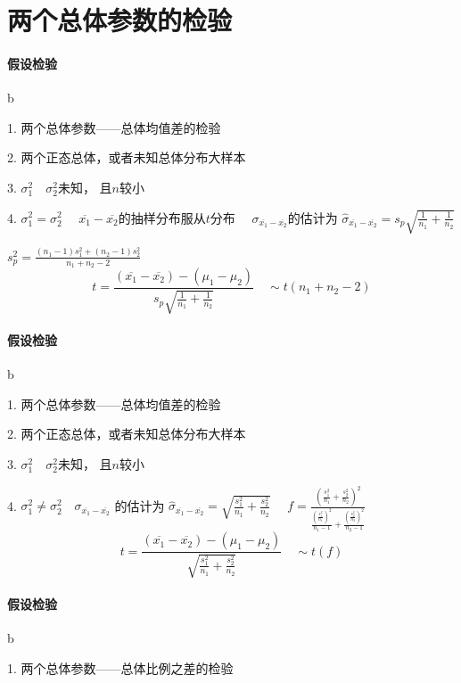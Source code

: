 \documentclass[UTF8,10pt]{book}
\begin{document}
    \section{两个总体参数的检验}

    
    \paragraph{假设检验} b
   
    1. 两个总体参数——总体均值差的检验 
    
    2. 两个正态总体，或者未知总体分布大样本 
    
    3. $\sigma_1^2 \quad \sigma_2^2$未知，
    且$n$较小 
    
    4. $\sigma_1^2 = \sigma_2^2 \quad$	
    $\overline{x_1} - \overline{x_2}$的抽样分布服从$t$分布 
    $\quad \sigma_{\overline{x_1} - \overline{x_2}} $的估计为 
    $ \hat{\sigma}_{\overline{x_1} - \overline{x_2}} =s_p \sqrt{\frac{1}{n_1}+\frac{1}{n_2}} $ 
    
    $s_p^2 = \frac{(n_1-1)s_1^2 + (n_2-1)s_2^2}{n_1+n_2-2}$ $$ t = \frac{(\overline{x_1} - \overline{x_2} )- (\mu_1-\mu_2)}{s_p \sqrt{\frac{1}{n_1}+\frac{1}{n_2}}} \quad \sim t(n_1+n_2-2)$$
    
    \paragraph{假设检验} b
    
    1. 两个总体参数——总体均值差的检验 
    
    2. 两个正态总体，或者未知总体分布大样本 
    
    3. $\sigma_1^2 \quad \sigma_2^2$未知，    且$n$较小 
    
    4. $\sigma_1^2 \neq \sigma_2^2 \quad \sigma_{\overline{x_1} - \overline{x_2}} $
    的估计为 $ \hat{\sigma}_{\overline{x_1} - \overline{x_2}} =\sqrt{\frac{s_1^2}{n_1}+\frac{s_2^2}{n_2}} \quad$ 
    $f = \frac{(\frac{s_1^2}{n_1}+\frac{s_2^2}{n_2})^2}{\frac{(\frac{s_1^2}{n_1})^2}{n_1-1} + \frac{(\frac{s_2^2}{n_2})^2}{n_2-1}}$ 
    $$t = \frac{( \overline{x_1} - \overline{x_2} )- (\mu_1-\mu_2)}{\sqrt{\frac{s_1^2}{n_1}+\frac{s_2^2}{n_2}}} \quad \sim t(f)$$
    
    \paragraph{假设检验} b
    
    1. 两个总体参数——总体比例之差的检验 
    
\end{document}
